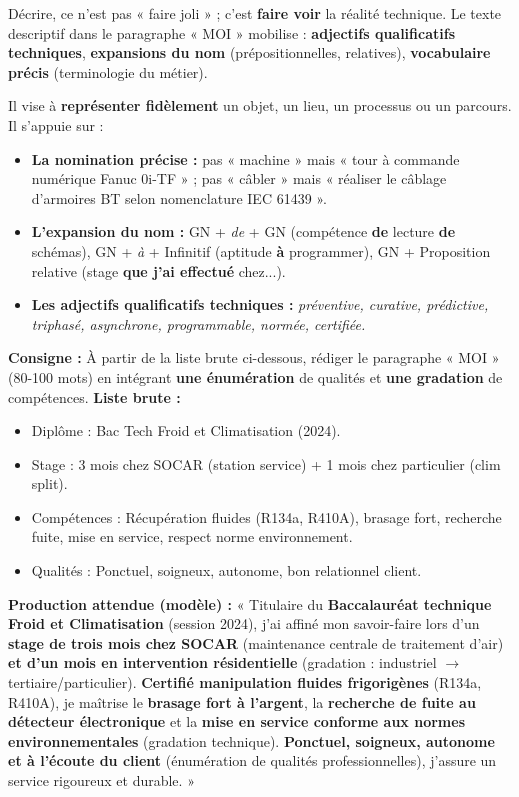 \documentclass[11pt]{article}
\begin{document}
Décrire, ce n'est pas « faire joli » ; c'est \textbf{faire voir} la réalité technique. Le texte descriptif dans le paragraphe « MOI » mobilise : \textbf{adjectifs qualificatifs techniques}, \textbf{expansions du nom} (prépositionnelles, relatives), \textbf{vocabulaire précis} (terminologie du métier).

\begin{definition}
Il vise à \textbf{représenter fidèlement} un objet, un lieu, un processus ou un parcours. Il s'appuie sur :
\begin{itemize}
    \item \textbf{La nomination précise :} pas « machine » mais « tour à commande numérique Fanuc 0i-TF » ; pas « câbler » mais « réaliser le câblage d'armoires BT selon nomenclature IEC 61439 ».
    \item \textbf{L'expansion du nom :} GN + \textit{de} + GN (compétence \textbf{de} lecture \textbf{de} schémas), GN + \textit{à} + Infinitif (aptitude \textbf{à} programmer), GN + Proposition relative (stage \textbf{que j'ai effectué} chez...).
    \item \textbf{Les adjectifs qualificatifs techniques :} \textit{préventive, curative, prédictive, triphasé, asynchrone, programmable, normée, certifiée.}
\end{itemize}
\end{definition}

\begin{methode}
\textbf{Consigne :} À partir de la liste brute ci-dessous, rédiger le paragraphe « MOI » (80-100 mots) en intégrant \textbf{une énumération} de qualités et \textbf{une gradation} de compétences.
\textbf{Liste brute :}
\begin{itemize}
    \item Diplôme : Bac Tech Froid et Climatisation (2024).
    \item Stage : 3 mois chez SOCAR (station service) + 1 mois chez particulier (clim split).
    \item Compétences : Récupération fluides (R134a, R410A), brasage fort, recherche fuite, mise en service, respect norme environnement.
    \item Qualités : Ponctuel, soigneux, autonome, bon relationnel client.
\end{itemize}
\textbf{Production attendue (modèle) :}
« Titulaire du \textbf{Baccalauréat technique Froid et Climatisation} (session 2024), j'ai affiné mon savoir-faire lors d'un \textbf{stage de trois mois chez SOCAR} (maintenance centrale de traitement d'air) \textbf{et d'un mois en intervention résidentielle} (gradation : industriel $\rightarrow$ tertiaire/particulier). \textbf{Certifié manipulation fluides frigorigènes} (R134a, R410A), je maîtrise le \textbf{brasage fort à l'argent}, la \textbf{recherche de fuite au détecteur électronique} et la \textbf{mise en service conforme aux normes environnementales} (gradation technique). \textbf{Ponctuel, soigneux, autonome et à l'écoute du client} (énumération de qualités professionnelles), j'assure un service rigoureux et durable. »
\end{methode}
\end{document}
